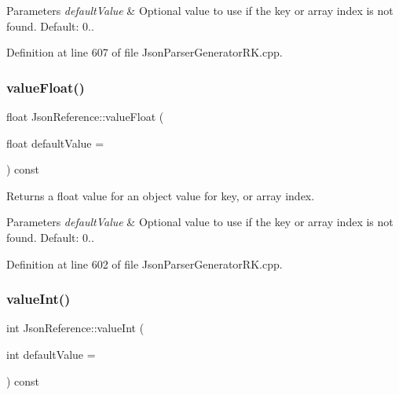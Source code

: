 \begin{DoxyParams}{Parameters}
{\em default\+Value} & Optional value to use if the key or array index is not found. Default\+: 0.. \\
\hline
\end{DoxyParams}


Definition at line 607 of file Json\+Parser\+Generator\+R\+K.\+cpp.

\mbox{\label{class_json_reference_afa346d628f8ecb4ad2b7a67c7634a85c}} 
\subsubsection{\texorpdfstring{value\+Float()}{valueFloat()}}
{\footnotesize\ttfamily float Json\+Reference\+::value\+Float (\begin{DoxyParamCaption}\item[{float}]{default\+Value = {} }\end{DoxyParamCaption}) const}



Returns a float value for an object value for key, or array index. 


\begin{DoxyParams}{Parameters}
{\em default\+Value} & Optional value to use if the key or array index is not found. Default\+: 0.. \\
\hline
\end{DoxyParams}


Definition at line 602 of file Json\+Parser\+Generator\+R\+K.\+cpp.

\mbox{\label{class_json_reference_afcf4b05a4b789ca1ea938a1adb33cafa}} 
\subsubsection{\texorpdfstring{value\+Int()}{valueInt()}}
{\footnotesize\ttfamily int Json\+Reference\+::value\+Int (\begin{DoxyParamCaption}\item[{int}]{default\+Value = {} }\end{DoxyParamCaption}) const}



